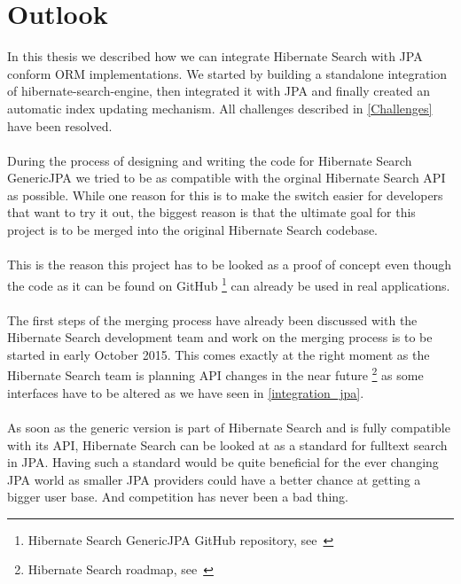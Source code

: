 \section{Outlook}\label{outlook}

In this thesis we described how we can integrate Hibernate Search with JPA conform ORM implementations. We started by building a standalone integration of hibernate-search-engine, then integrated it with JPA and finally created an automatic index updating mechanism. All challenges described in \ref{Challenges} have been resolved.
\\\\
During the process of designing and writing the code for Hibernate Search GenericJPA we tried to be as compatible with the orginal Hibernate Search API as possible. While one reason for this is to make the switch easier for developers that want to try it out, the biggest reason is that the ultimate goal for this project is to be merged into the original Hibernate Search codebase.
\\\\
This is the reason this project has to be looked as a proof of concept even though the code as it can be found on GitHub \footnote{Hibernate Search GenericJPA GitHub repository, see~\cite{hibernate_genericjpa_github}} can already be used in real applications.
\\\\
The first steps of the merging process have already been discussed with the Hibernate Search development team and work on the merging process is to be started in early October 2015. This comes exactly at the right moment as the Hibernate Search team is planning API changes in the near future \footnote{Hibernate Search roadmap, see~\cite{hibernate_search_roadmap}} as some interfaces have to be altered as we have seen in \ref{integration_jpa}.
\\\\
As soon as the generic version is part of Hibernate Search and is fully compatible with its API, Hibernate Search can be looked at as a standard for fulltext search in JPA. Having such a standard would be quite beneficial for the ever changing JPA world as smaller JPA providers could have a better chance at getting a bigger user base. And competition has never been a bad thing.

